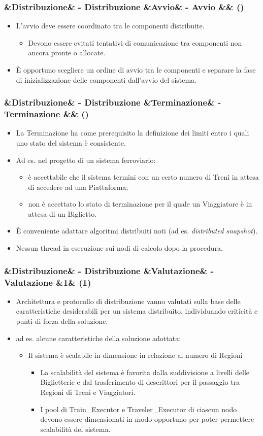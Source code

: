 \documentclass[slidestop,compress,blackandwhite]{beamer}
\newcommand{\ii}[1]{\textit{#1}}
\newcommand{\cm}[1]{\vspace{#1cm}}
\newcommand{\newtitle}[4]{
	#1 
	\ifx&#2&%
	\else
  		\large- #2
	\fi
	\ifx&#3&%
	\else
  		\small- #3
	\fi
	\ifx&#4&%
	\else
  		\normalsize (#4)
	\fi
}
\newcommand{\newframe}[5]{
	\begin{frame}
		\frametitle{\newtitle{#1}{#2}{#3}{#4}}
		#5
	\end{frame}
}
\newcommand{\myitemize}[1]{
	\begin{itemize}\itemsep4pt
	#1
	\end{itemize}
}
\begin{document}
	\newframe{}{Distribuzione}{Avvio}{}{
		\cm{0.5}
		\justifying
		\myitemize{
			\item L'avvio deve essere coordinato tra le componenti distribuite.
				\cm{0.3}
				\myitemize {
					\item Devono essere evitati tentativi di comunicazione tra componenti non ancora pronte o allocate.
				}
				\cm{0.3}
			\item \`E opportuno scegliere un ordine di avvio tra le componenti e separare la fase di inizializzazione delle componenti dall'avvio del sistema.
		}
		
	}
	
	\newframe{}{Distribuzione}{Terminazione}{}{
		\cm{0.5}
		\myitemize{
			\item La Terminazione ha come prerequisito la definizione dei limiti entro i quali uno stato del sistema è consistente. 
			\item Ad es. nel progetto di un sistema ferroviario:
				\myitemize {
					\item è accettabile che il sistema termini con un certo numero di Treni in attesa di accedere ad una Piattaforma;
					\item non è accettato lo stato di terminazione per il quale un Viaggiatore è in attesa di un Biglietto.
				}
			\item \`E conveniente adattare algoritmi distribuiti noti (ad es. \ii{distributed snapshot}).
			\item Nessun thread in esecuzione sui nodi di calcolo dopo la procedura.
		}
	}
	
	\newframe{}{Distribuzione}{Valutazione}{1}{
		\myitemize {
			\item Architettura e protocollo di distribuzione vanno valutati sulla base delle caratteristiche desiderabili per un sistema distribuito, individuando criticità e punti di forza della soluzione.
			\item ad es. alcune caratteristiche della soluzione adottata:\\
				\myitemize {
					\item Il sistema è scalabile in dimensione in relazione al numero di Regioni\\
						\myitemize {
							\item La scalabilità del sistema è favorita dalla suddivisione a livelli delle Biglietterie e dal trasferimento di descrittori per il passaggio tra Regioni di Treni e Viaggiatori.
							\item I pool di Train\_Executor e Traveler\_Executor di ciascun nodo devono essere dimensionati in modo opportuno per poter permettere scalabilità del sistema.
						}
				}
		}
	}
	
\end{document}
